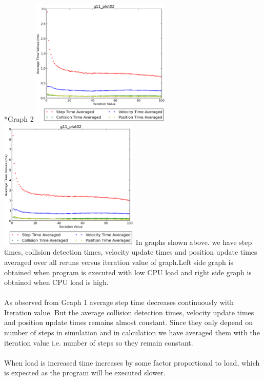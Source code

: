 \documentclass[11pt]{article}
\begin{document}
\begin{subsection}*{Graph 2}
\includegraphics[width=0.5\textwidth,keepaspectratio]{2.eps} \includegraphics[width=0.5\textwidth,keepaspectratio]{load_2.eps}
In graphs shown above. we have step times, collision detection times, velocity update times and position update times averaged over all reruns versus iteration value of graph.Left side graph is obtained when program is executed with low CPU load and right side graph is obtained when CPU load is high.
\\\\
As observed from Graph 1 average step time decreases continuously with Iteration value.
But the average collision detection times, velocity update times and position update times remains almost constant. Since they only depend on number of steps in simulation and in calculation we have averaged them with the iteration value i.e. number of steps so they remain constant.
\\\\
When load is increased time increases by some factor proportional to load, which is expected as the program will be executed slower. 
\end{subsection}
\end{document}
